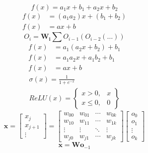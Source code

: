 \documentclass[../SOP.tex]{subfile}
\begin{document}
  \begin{equation*}
    f(x)=a_1x+b_1+a_2x+b_2
  \end{equation*}
  \begin{align*}
    f(x)&=(a_1a_2)x+(b_1+b_2)\\
    f(x)&=ax+b
  \end{align*}
\begin{equation*}
  O_i=\mathbf{W_i}\sum O_{i-1}(O_{i-2}(\dots))
\end{equation*}
  \begin{align*}
    f(x)&= a_1(a_2x+b_2)+b_1\\
    f(x)&= a_1a_2x + a_1b_2 +b_1\\
    f(x)&= ax+b
  \end{align*}
\begin{gather*}
  \sigma(x)=\frac{1}{1+e^{-x}}\\
  ReLU(x)=\begin{Bmatrix}
    x>0, & x\\
    x\leq 0, & 0
  \end{Bmatrix}
\end{gather*}
\begin{equation}
  \mathbf{x}=\begin{bmatrix}
    x_j \\ x_{j+1} \\ \vdots
  \end{bmatrix}
  =
  \begin{bmatrix}
    w_{00} & w_{01} & \cdots & w_{0k} \\
    w_{10} & w_{11} & \cdots & w_{1k} \\
    \vdots & \vdots & \ddots & \vdots \\
    w_{j0} & w_{j1} & \cdots & w_{jk}
  \end{bmatrix}
  \begin{bmatrix}
    o_0 \\ o_1 \\ \vdots \\ o_k
  \end{bmatrix}
  \label{eq:inputEx}
\end{equation}
\begin{equation}
  \mathbf{x}=\mathbf{W}\mathbf{o}_{-1}
  \label{eq:inputSimp}
\end{equation}
\end{document}
